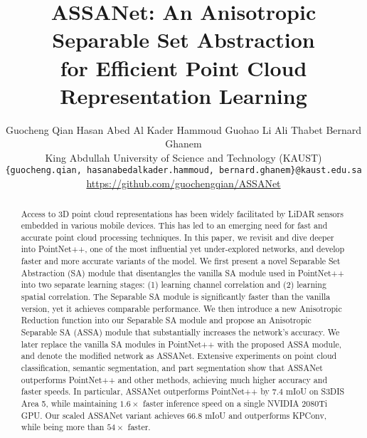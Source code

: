 \documentclass{article}
\begin{document}
\title{ASSANet: An Anisotropic Separable Set Abstraction \\ for Efficient Point Cloud Representation Learning
}

\author{Guocheng Qian 
\And
Hasan Abed Al Kader Hammoud 
\And Guohao Li 
\And Ali Thabet 
\AND Bernard Ghanem \\ 
King Abdullah University of Science and Technology (KAUST)\\
\texttt{\{guocheng.qian, hasanabedalkader.hammoud, bernard.ghanem\}@kaust.edu.sa} \\
\url{https://github.com/guochengqian/ASSANet}
}

\maketitle
\begin{abstract}
Access to 3D point cloud representations has been widely facilitated by LiDAR sensors embedded in various mobile devices. This has led to an emerging need for fast and accurate point cloud processing techniques. In this paper, we revisit and dive deeper into PointNet++, one of the most influential yet under-explored networks, and develop faster and more accurate variants of the model. We first present a novel Separable Set Abstraction (SA) module that disentangles the vanilla SA module used in PointNet++ into two separate learning stages: (1) learning channel correlation and (2) learning spatial correlation. The Separable SA module is significantly faster than the vanilla version, yet it achieves comparable performance.  We then introduce a new Anisotropic Reduction function into our Separable SA module and propose an Anisotropic Separable SA (ASSA) module that substantially increases the network's accuracy. We later replace the vanilla SA modules in PointNet++ with the proposed ASSA module, and denote the modified network as ASSANet. Extensive experiments on point cloud classification, semantic segmentation, and part segmentation show that ASSANet outperforms PointNet++ and other methods, achieving much higher accuracy and faster speeds. In particular, ASSANet outperforms PointNet++ by $7.4$ mIoU on S3DIS Area 5, while maintaining $1.6 \times $ faster inference speed on a single NVIDIA 2080Ti GPU. Our scaled ASSANet variant achieves $66.8$ mIoU and outperforms KPConv, while being more than $54 \times$ faster.

\end{abstract}
\end{document}
